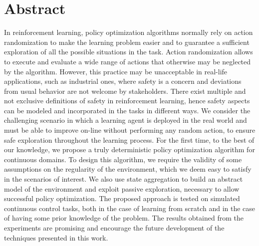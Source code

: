 
\begingroup
\let\clearpage\relax
\let\cleardoublepage\relax
\let\cleardoublepage\relax

\chapter*{Abstract}
In reinforcement learning, policy optimization algorithms normally rely on action randomization to make the learning problem easier and to guarantee a sufficient exploration of all the possible situations in the task. Action randomization allows to execute and evaluate a wide range of actions that otherwise may be neglected by the algorithm. However, this practice may be unacceptable in real-life applications, such as industrial ones, where safety is a concern and deviations from usual behavior are not welcome by stakeholders. There exist multiple and not exclusive definitions of safety in reinforcement learning, hence safety aspects can be modeled and incorporated in the tasks in different ways. We consider the challenging scenario in which a learning agent is deployed in the real world and must be able to improve on-line without performing any random action, to ensure safe exploration throughout the learning process. For the first time, to the best of our knowledge, we propose a truly deterministic policy optimization algorithm for continuous domains. To design this algorithm, we require the validity of some assumptions on the regularity of the environment, which we deem easy to satisfy in the scenarios of interest. We also use state aggregation to build an abstract model of the environment and exploit passive exploration, necessary to allow successful policy optimization. The proposed approach is tested on simulated continuous control tasks, both in the case of learning from scratch and in the case of having some prior knowledge of the problem. The results obtained from the experiments are promising and encourage the future development of the techniques presented in this work.

\vfill
\newpage
{}
